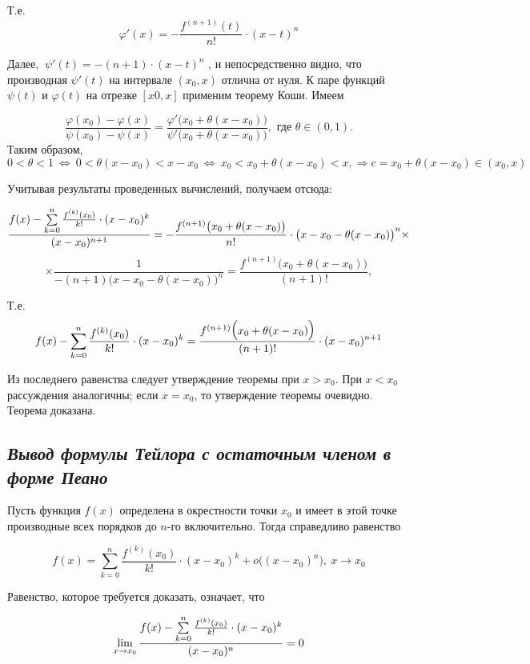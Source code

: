 Т.е. $$\varphi'(x) =-\frac{f^{(n+1)}(t)}{n!}
\cdot (x - t)^n$$

Далее, $\ \psi'(t) = -(n + 1)\cdot (x - t)^n$ , и непосредственно видно, что производная $\psi'(t)$ на интервале $(x_0, x)$ отлична от нуля. К паре функций $\psi(t)$ и $\varphi(t)$ на отрезке $[x0, x]$ применим теорему Коши. Имеем

$$\frac{\varphi(x_0) - \varphi(x)}{\psi(x_0) - \psi(x)} =\frac{\varphi'\big(x_0 + \theta(x - x_0)\big)}{\psi'\big(x_0+\theta(x - x_0)\big)} , \text{ где } \theta \in (0, 1).$$ Таким образом, $0 < \theta<1 \ \iff \ 0 < \theta (x - x_0) < x - x_0 \ \iff \ x_0 < x_0 + \theta (x - x_0) < x, \Rightarrow c = x_0 + \theta (x - x_0) \in (x_0, x)$

Учитывая результаты проведенных вычислений, получаем отсюда:

$$\frac{f(x) - \sum\limits_{k=0}^n{\Large\frac{f^{(k)}(x_0)}{k!}}\cdot (x - x_0)^k}{(x - x_0)^{n + 1}} = - \frac{f^{(n + 1)}\big(x_0 + \theta(x - x_0)\big)}{n!}\cdot \big(x - x_0 - \theta(x - x_0)\big)^n\times$$ $$\times \frac{1}{-(n + 1)\big(x - x_0 - \theta(x - x_0)\big)^n} = \frac{f^{(n+1)}\big(x_0 + \theta(x - x_0)\big)}{(n+1)!},$$

Т.е. $$f(x) - \sum\limits_{k=0}^n{\Large\frac{f^{(k)}(x_0)}{k!}}\cdot (x - x_0)^k = {\Large\frac{f^{(n+1)}\big(x_0 + \theta(x - x_0)\big)}{(n+1)!}}\cdot (x - x_0)^{n + 1}$$

Из последнего равенства следует утверждение теоремы при $x > x_0$. При $x < x_0$ рассуждения аналогичны; если $x = x_0$, то утверждение теоремы очевидно. Теорема доказана.
\newpage 
\subsection{\textit{Вывод формулы Тейлора с остаточным членом в форме Пеано}}

Пусть функция $f(x)$ определена в окрестности точки $x_0$ и имеет в этой точке производные всех порядков до $n$-го включительно. Тогда справедливо равенство
\begin{mainQuote}

$$f(x) = \sum\limits_{k=0}^n\frac{f^{(k)}(x_0)}{k!}\cdot (x - x_0)^k + o\big((x - x_0)^n\big), \ x \rightarrow x_0$$
\end{mainQuote}

Равенство, которое требуется доказать, означает, что

$$\lim\limits_{x \rightarrow x_0}{\frac{f(x) -\sum\limits_{k=0}^n{\Large\frac{f^{(k)}(x_0)}{k!}}\cdot (x - x_0)^k}{(x - x_0)^n}} = 0$$

